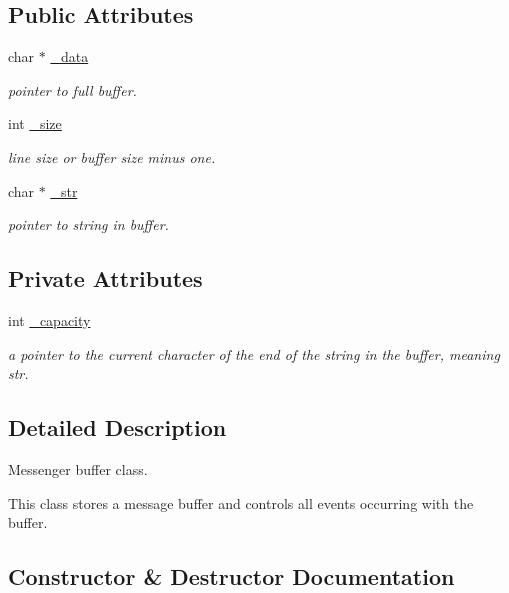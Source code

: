 \subsection*{Public Attributes}
\begin{DoxyCompactItemize}
\item 
char $\ast$ \hyperlink{classmessage_a6d995411bcb21f78e2b123e9449df39c}{\+\_\+data}
\begin{DoxyCompactList}\small\item\em pointer to full buffer. \end{DoxyCompactList}\item 
int \hyperlink{classmessage_aaa6c8c862a2c0bc18c802314cc58961d}{\+\_\+size}
\begin{DoxyCompactList}\small\item\em line size or buffer size minus one. \end{DoxyCompactList}\item 
char $\ast$ \hyperlink{classmessage_a2606729876d9435e492e52b9ffca7968}{\+\_\+str}
\begin{DoxyCompactList}\small\item\em pointer to string in buffer. \end{DoxyCompactList}\end{DoxyCompactItemize}
\subsection*{Private Attributes}
\begin{DoxyCompactItemize}
\item 
int \hyperlink{classmessage_adc9ca8d1d3cf06b3975b6e768a942c61}{\+\_\+capacity}
\begin{DoxyCompactList}\small\item\em a pointer to the current character of the end of the string in the buffer, meaning str. \end{DoxyCompactList}\end{DoxyCompactItemize}


\subsection{Detailed Description}
Messenger buffer class. 

This class stores a message buffer and controls all events occurring with the buffer. 

\subsection{Constructor \& Destructor Documentation}
\mbox{\label{classmessage_aba502b8bb024cc38b45756fdf581f915}} 
